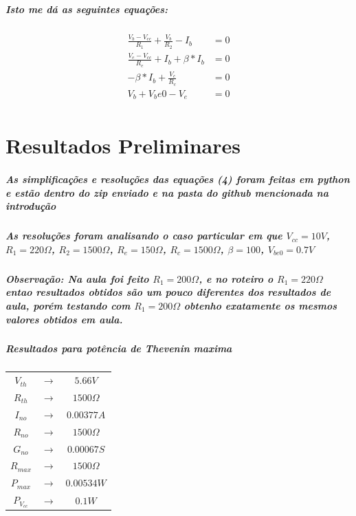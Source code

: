\documentclass[12pt,twoside, a4paper, twocolumn]{article}
\begin{document}
\subparagraph*{Isto me dá as seguintes equações:}

\begin{equation}
    \begin{aligned}
        \frac{V_b - V_{cc}}{R_1} + \frac{V_b}{R_2} - I_b & = 0 \\
        \frac{V_e - V_{cc}}{R_e} + I_b + \beta*I_b       & = 0 \\
        -\beta*I_b + \frac{V_c}{R_c}                     & = 0 \\
        V_b + {V_be0} - V_e                              & = 0 \\
    \end{aligned}
\end{equation}

\section{Resultados Preliminares}

\subparagraph*{As simplificações e resoluções das equações (4) foram feitas em python e estão dentro do zip enviado e na pasta do github mencionada na introdução}

\subparagraph*{As resoluções foram analisando o caso particular em que $V_{cc} = 10V$, $R_1 = 220 \varOmega$, $R_2 = 1500 \varOmega$, $R_e = 150\varOmega$, $R_c = 1500\varOmega$, $\beta = 100$, $V_{be0} = 0.7V$}

\subparagraph*{Observação: Na aula foi feito $R_1 = 200 \varOmega$, e no roteiro o $R_1 = 220 \varOmega$ entao resultados obtidos são um pouco diferentes dos resultados de aula, porém testando com $R_1 = 200 \varOmega$ obtenho exatamente os mesmos valores obtidos em aula.}


\subparagraph*{Resultados para potência de Thevenin maxima}

\begin{center}
    \begin{tabular}{ |ccc| }
        \hline
        $V_{th}$     & $\rightarrow$ & $5.66V$          \\
        $R_{th}$     & $\rightarrow$ & $1500 \varOmega$ \\
        $I_{no}$     & $\rightarrow$ & $0.00377 A$      \\
        $R_{no}$     & $\rightarrow$ & $1500 \varOmega$ \\
        $G_{no}$     & $\rightarrow$ & $0.00067 S$      \\
        $R_{max}$    & $\rightarrow$ & $1500 \varOmega$ \\
        $P_{max}$    & $\rightarrow$ & $0.00534W$       \\
        $P_{V_{cc}}$ & $\rightarrow$ & $0.1W$           \\

        \hline
    \end{tabular}
\end{center}
\end{document}
